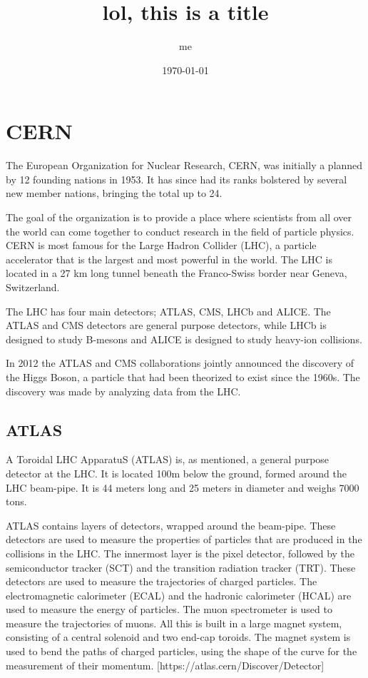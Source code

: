 \documentclass{tufte-book}
\title{lol, this is a title}
\author{me}
\date{\today}
\begin{document}
\maketitle

\newpage

\tableofcontents

\newpage







\chapter{CERN}

The European Organization for Nuclear Research, CERN, was initially a planned by 12 founding nations in 1953. It has since had its ranks bolstered by several new member nations, bringing the total up to 24.

The goal of the organization is to provide a place where scientists from all over the world can come together to conduct research in the field of particle physics. CERN is most famous for the Large Hadron Collider (LHC), a particle accelerator that is the largest and most powerful in the world. The LHC is located in a 27 km long tunnel beneath the Franco-Swiss border near Geneva, Switzerland.

The LHC has four main detectors; ATLAS, CMS, LHCb and ALICE. The ATLAS and CMS detectors are general purpose detectors, while LHCb is designed to study B-mesons and ALICE is designed to study heavy-ion collisions.

In 2012 the ATLAS and CMS collaborations jointly announced the discovery of the Higgs Boson, a particle that had been theorized to exist since the 1960s. The discovery was made by analyzing data from the LHC.

\section{ATLAS}
A Toroidal LHC ApparatuS (ATLAS) is, as mentioned, a general purpose detector at the LHC.
It is located 100m below the ground, formed around the LHC beam-pipe. It is 44 meters long and 25 meters in diameter and weighs 7000 tons.

ATLAS contains layers of detectors, wrapped around the beam-pipe. These detectors are used to measure the properties of particles that are produced in the collisions in the LHC. The innermost layer is the pixel detector, followed by the semiconductor tracker (SCT) and the transition radiation tracker (TRT). These detectors are used to measure the trajectories of charged particles. The electromagnetic calorimeter (ECAL) and the hadronic calorimeter (HCAL) are used to measure the energy of particles. The muon spectrometer is used to measure the trajectories of muons. All this is built in a large magnet system, consisting of a central solenoid and two end-cap toroids. The magnet system is used to bend the paths of charged particles, using the shape of the curve for the measurement of their momentum. [https://atlas.cern/Discover/Detector]
\end{document}
